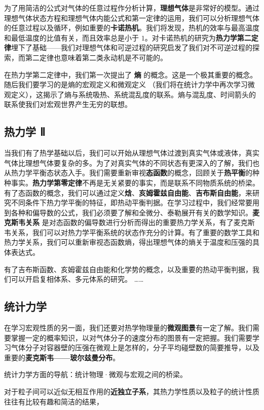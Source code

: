 为了用简洁的公式对气体的任意过程作分析计算，\textbf{理想气体}是非常好的模型。通过理想气体状态方程和理想气体内能公式和第一定律的运用，我们可以分析理想气体的任意过程以及循环，例如重要的\textbf{卡诺热机}。我们将发现，热机的效率与最高温度和最低温度的比值有关，而且效率总是小于 $1$。对卡诺热机的研究为\textbf{热力学第二定律}埋下了基础——我们对理想气体和可逆过程的研究启发了我们对不可逆过程的探索，而第二定律也意味着第二类永动机是不可能的。

在热力学第二定律中，我们第一次提出了 \textbf{熵} 的概念。这是一个极其重要的概念。随后我们要学习的是熵的宏观定义和微观定义 （我们将在统计力学中再次学习微观定义），这揭示了熵与系统吸热、系统混乱度的联系。熵与混乱度、时间箭头的联系使我们对宏观世界产生无穷的联想。

\subsection{热力学 Ⅱ}

当我们有了热学基础以后，我们可以开始从理想气体过渡到真实气体或液体，真实气体比理想气体要复杂的多。为了对真实气体的不同状态有更深入的了解，我们也从热力学平衡态状态入手。我们需要重新审视\textbf{态函数}的概念，回顾关于\textbf{热平衡}的种种事实。\textbf{热力学第零定律}不再是无关紧要的事实，而是联系不同物质系统的桥梁。有了态函数的概念，我们可以通过定义\textbf{焓}、\textbf{亥姆霍兹自由能}、\textbf{吉布斯自由能}，来研究不同条件下热力学平衡的特征，即热动平衡判据。在学习过程中，我们经常要用到各种和偏导数的公式，我们必须要了解和全微分、泰勒展开有关的数学知识。\textbf{麦克斯韦关系} 是对态函数的偏导数进行分析而得出的重要热力学关系，有了麦克斯韦关系，我们可以对热力学平衡系统的状态作充分的计算。有了重要的数学工具和热力学关系，我们可以重新审视态函数熵，得出理想气体的熵关于温度和压强的具体表达式。

有了吉布斯函数、亥姆霍兹自由能和化学势的概念，以及重要的热动平衡判据，我们可以开启复相体系、多元体系的研究。
……


\subsection{统计力学}

在学习宏观性质的另一面，我们还要对热学物理量的\textbf{微观图景}有一定了解。我们需要掌握一定的概率知识，以对气体分子的速度分布的图景有一定把握。我们需要学习气体分子对容器壁的压强在微观上是怎样的，分子平均碰壁数的简要推导，以及重要的\textbf{麦克斯韦——玻尔兹曼分布}。

统计力学方面的导航：统计物理·微观与宏观之间的桥梁。

对于粒子间可以近似无相互作用的\textbf{近独立子系}，其热力学性质以及粒子的统计性质往往有比较有趣和简洁的结果，